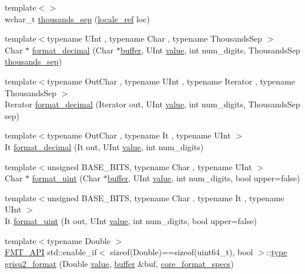 \begin{DoxyCompactItemize}
\item 
{\footnotesize template$<$$>$ }\\wchar\+\_\+t \hyperlink{namespaceinternal_a1b8406f28dd9f5cba3e304c8b564db23}{thousands\+\_\+sep} (\hyperlink{classinternal_1_1locale__ref}{locale\+\_\+ref} loc)
\item 
{\footnotesize template$<$typename U\+Int , typename Char , typename Thousands\+Sep $>$ }\\Char $\ast$ \hyperlink{namespaceinternal_a40361ef75be4acee6abc19730bdb54e3}{format\+\_\+decimal} (Char $\ast$\hyperlink{namespaceinternal_a5fcdbc3efad1f390e6c3f0fdafa56122}{buffer}, U\+Int \hyperlink{classinternal_1_1value}{value}, int num\+\_\+digits, Thousands\+Sep \hyperlink{namespaceinternal_a604560431c478cefdd7b771e7307d0d2}{thousands\+\_\+sep})
\item 
{\footnotesize template$<$typename Out\+Char , typename U\+Int , typename Iterator , typename Thousands\+Sep $>$ }\\Iterator \hyperlink{namespaceinternal_a4a9acc87fcfbaaceb13bd64a92c866ed}{format\+\_\+decimal} (Iterator out, U\+Int \hyperlink{classinternal_1_1value}{value}, int num\+\_\+digits, Thousands\+Sep sep)
\item 
{\footnotesize template$<$typename Out\+Char , typename It , typename U\+Int $>$ }\\It \hyperlink{namespaceinternal_ab02a01601a4d7fb94f4865485d7b3678}{format\+\_\+decimal} (It out, U\+Int \hyperlink{classinternal_1_1value}{value}, int num\+\_\+digits)
\item 
{\footnotesize template$<$unsigned B\+A\+S\+E\+\_\+\+B\+I\+TS, typename Char , typename U\+Int $>$ }\\Char $\ast$ \hyperlink{namespaceinternal_a4308052bc51067b992e122ace6fd606c}{format\+\_\+uint} (Char $\ast$\hyperlink{namespaceinternal_a5fcdbc3efad1f390e6c3f0fdafa56122}{buffer}, U\+Int \hyperlink{classinternal_1_1value}{value}, int num\+\_\+digits, bool upper=false)
\item 
{\footnotesize template$<$unsigned B\+A\+S\+E\+\_\+\+B\+I\+TS, typename Char , typename It , typename U\+Int $>$ }\\It \hyperlink{namespaceinternal_a0082ec32cbe6bacb75040266def77648}{format\+\_\+uint} (It out, U\+Int \hyperlink{classinternal_1_1value}{value}, int num\+\_\+digits, bool upper=false)
\item 
{\footnotesize template$<$typename Double $>$ }\\\hyperlink{core_8h_a9a4960b70582ed2620911a0b75dce0b5}{F\+M\+T\+\_\+\+A\+PI} std\+::enable\+\_\+if$<$ sizeof(Double)==sizeof(uint64\+\_\+t), bool $>$\+::\hyperlink{namespaceinternal_a8661864098ac0acff9a6dd7e66f59038}{type} \hyperlink{namespaceinternal_af9ded6caf43e3045bce5bfdd382284ed}{grisu2\+\_\+format} (Double \hyperlink{classinternal_1_1value}{value}, \hyperlink{namespaceinternal_a5fcdbc3efad1f390e6c3f0fdafa56122}{buffer} \&buf, \hyperlink{structcore__format__specs}{core\+\_\+format\+\_\+specs})

\end{DoxyCompactItemize}
